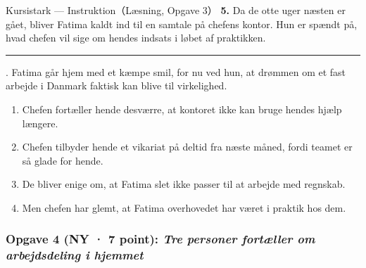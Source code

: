 \begin{emailbox}{Kursistark --- Instruktion（Læsning, Opgave 3）}
\vspace{0.4em}
\textbf{5.} Da de otte uger næsten er gået, bliver Fatima kaldt ind til en samtale på chefens kontor. Hun er spændt på, hvad chefen vil sige om hendes indsats i løbet af praktikken. \rule{3.2cm}{0.4pt}. Fatima går hjem med et kæmpe smil, for nu ved hun, at drømmen om et fast arbejde i Danmark faktisk kan blive til virkelighed.
\begin{enumerate}[label=\textbf{\Alph*.}, leftmargin=1.8em, itemsep=0.12em, topsep=0.25em]
  \item Chefen fortæller hende desværre, at kontoret ikke kan bruge hendes hjælp længere.
  \item Chefen tilbyder hende et vikariat på deltid fra næste måned, fordi teamet er så glade for hende.
  \item De bliver enige om, at Fatima slet ikke passer til at arbejde med regnskab.
  \item Men chefen har glemt, at Fatima overhovedet har været i praktik hos dem.
\end{enumerate}
\end{emailbox}

\subsubsection*{Opgave 4 (NY · 7 point): \textit{Tre personer fortæller om arbejdsdeling i hjemmet}}

